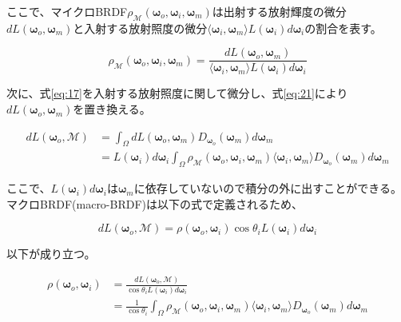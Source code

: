 \documentclass[a4j,xelatex,ja=standard]{bxjsarticle}
\begin{document}
ここで、マイクロBRDF$\rho_{\mathcal M}(\boldsymbol{\omega}_o, \boldsymbol{\omega}_i, \boldsymbol{\omega}_m)$は出射する放射輝度の微分$dL(\boldsymbol{\omega}_o, \boldsymbol{\omega}_m)$と入射する放射照度の微分$\langle \boldsymbol{\omega}_i, \boldsymbol{\omega}_m \rangle L(\boldsymbol{\omega}_i) d\boldsymbol{\omega}_i$の割合を表す。

\begin{equation}
    \rho_{\mathcal M}(\boldsymbol{\omega}_o, \boldsymbol{\omega}_i, \boldsymbol{\omega}_m) = \frac{dL(\boldsymbol{\omega}_o, \boldsymbol{\omega}_m)}{\langle \boldsymbol{\omega}_i, \boldsymbol{\omega}_m \rangle L(\boldsymbol{\omega}_i) d\boldsymbol{\omega}_i}
    \label{eq:21}
\end{equation}

次に、式\eqref{eq:17}を入射する放射照度に関して微分し、式\eqref{eq:21}により$dL(\boldsymbol{\omega}_o, \boldsymbol{\omega}_m)$を置き換える。

\begin{equation}
    \begin{split}
        dL(\boldsymbol{\omega}_o, \mathcal{M})
        &= \int_{\Omega} dL(\boldsymbol{\omega}_o, \boldsymbol{\omega}_m) D_{\boldsymbol{\omega}_o}(\boldsymbol{\omega}_m) d\boldsymbol{\omega}_m \\
        &= L(\boldsymbol{\omega}_i) d\boldsymbol{\omega}_i \int_{\Omega} \rho_{\mathcal M}(\boldsymbol{\omega}_o, \boldsymbol{\omega}_i, \boldsymbol{\omega}_m) \langle \boldsymbol{\omega}_i, \boldsymbol{\omega}_m \rangle D_{\boldsymbol{\omega}_o}(\boldsymbol{\omega}_m) d\boldsymbol{\omega}_m
    \end{split}
    \label{eq:22}
\end{equation}

ここで、$L(\boldsymbol{\omega}_i)d\boldsymbol{\omega}_i$は$\boldsymbol{\omega}_m$に依存していないので積分の外に出すことができる。
マクロBRDF(macro-BRDF)は以下の式で定義されるため、

\begin{equation}
    dL(\boldsymbol{\omega}_o, \mathcal{M}) = \rho(\boldsymbol{\omega}_o, \boldsymbol{\omega}_i) \cos\theta_i L(\boldsymbol{\omega}_i) d\boldsymbol{\omega}_i
    \label{eq:23}
\end{equation}

以下が成り立つ。

\begin{equation}
    \begin{split}
        \rho(\boldsymbol{\omega}_o, \boldsymbol{\omega}_i)
        &= \frac{dL(\boldsymbol{\omega}_o, \mathcal M)}{\cos\theta_i L(\boldsymbol{\omega}_i) d\boldsymbol{\omega}_i} \\
        &= \frac{1}{\cos\theta_i} \int_{\Omega} \rho_{\mathcal M}(\boldsymbol{\omega}_o, \boldsymbol{\omega}_i, \boldsymbol{\omega}_m) \langle \boldsymbol{\omega}_i, \boldsymbol{\omega}_m \rangle D_{\boldsymbol{\omega}_o}(\boldsymbol{\omega}_m) d\boldsymbol{\omega}_m
    \end{split}
    \label{eq:24}
\end{equation}
\end{document}
